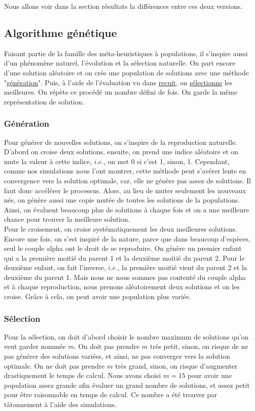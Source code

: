 \documentclass[11pt,french]{report}
\begin{document}
	Nous allons voir dans la section résultats la différences entre ces deux versions.
	
	\subsection{Algorithme génétique\label{Génétique}}
	Faisant partie de la famille des méta-heuristiques à populations, il s'inspire aussi d'un phénomène naturel, l'évolution et la sélection naturelle. On part encore d'une solution aléatoire et on crée une population de solutions avec une méthode "\hyperref[Génération]{génération}". Puis, à l'aide de l'évaluation vu dans \hyperref[recuit simple]{recuit}, on \hyperref[sélection]{sélectionne} les meilleures. On répète ce procédé un nombre défini de fois. On garde la même représentation de solution.
	
	\subsubsection{Génération\label{Génération}}
	Pour générer de nouvelles solutions, on s'inspire de la reproduction naturelle. D'abord on croise deux solutions, ensuite, on prend une indice aléatoire et on mute la valeur à cette indice, $i.e.$, on met 0 si c'est 1, sinon, 1. Cependant, comme nos simulations nous l'ont montrer, cette méthode peut s'avérer lente en convergence vers la solution optimale, car, elle ne génère pas assez de solutions. Il faut donc accélérer le processus. Alors, au lieu de muter seulement les nouveaux nés, on génère aussi une copie mutée de toutes les solutions de la populations. Ainsi, on évaluent beaucoup plus de solutions à chaque fois et on a une meilleure chance pour trouver la meilleure solution.\\
	
	Pour le croisement, on croise systématiquement les deux meilleures solutions. Encore une fois, on s'est inspiré de la nature, parce que dans beaucoup d'espèces, seul le couple alpha ont le droit de se reproduire. On génère un premier enfant qui a la première moitié du parent 1 et la deuxième moitié du parent 2. Pour le deuxième enfant, on fait l'inverse, $i.e.$, la première moitié vient du parent 2 et la deuxième du parent 1. Mais nous ne nous sommes pas contenté du couple alpha et à chaque reproduction, nous prenons aléatoirement deux solutions et on les croise. Grâce à cela, on peut avoir une population plus variée.
	
	\subsubsection{Sélection\label{sélection}}
	Pour la sélection, on doit d'abord choisir le nombre maximum de solutions qu'on veut garder nommée $m$. On doit pas prendre $m$ très petit, sinon, on risque de ne pas générer des solutions variées, et ainsi, ne pas converger vers la solution optimale. On ne doit pas prendre $m$ très grand, sinon, on risque d'augmenter drastiquement le temps de calcul. Nous avons choisi $m=15$ pour avoir une population assez grande afin évaluer un grand nombre de solutions, et assez petit pour être raisonnable en temps de calcul. Ce nombre a été trouver par tâtonnement à l'aide des simulations.
	
\end{document}
